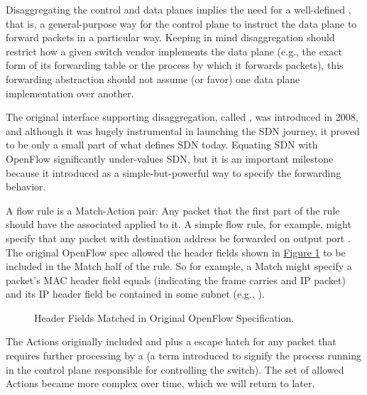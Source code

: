 \documentclass[letterpaper,11pt,english]{sphinxmanual}
\let\sphinxpxdimen\pdfpxdimen\else\newdimen\sphinxpxdimen
\begin{document}
Disaggregating the control and data planes implies the need for a
well-defined , that is, a general-purpose way
for the control plane to instruct the data plane to forward packets in
a particular way. Keeping in mind disaggregation should 
restrict how a given switch vendor implements the data plane (e.g.,
the exact form of its forwarding table or the process by which it
forwards packets), this forwarding abstraction should not assume (or
favor) one data plane implementation over another.

The original interface supporting disaggregation, called ,
was introduced in 2008, and although it was hugely instrumental in
launching the SDN journey, it proved to be only a small part of what
defines SDN today. Equating SDN with OpenFlow significantly
under-values SDN, but it is an important milestone because it
introduced  as a simple-but-powerful way to specify the
forwarding behavior.

A flow rule is a Match-Action pair: Any packet that  the
first part of the rule should have the associated  applied to
it. A simple flow rule, for example, might specify that any packet
with destination address  be forwarded on output port . The
original OpenFlow spec allowed the header fields shown in
\hyperref[\detokenize{intro:fig-headers}]{Figure \ref{\detokenize{intro:fig-headers}}} to be included in the Match half of
the rule. So for example, a Match might specify a packet’s MAC header
 field equals  (indicating the frame carries and IP
packet) and its IP header  field be contained in some
subnet (e.g., ).

\begin{figure}[htbp]
\centering
\capstart

\noindent\sphinxincludegraphics[width=600\sphinxpxdimen]{{Slide3}.png}
\caption{Header Fields Matched in Original OpenFlow Specification.}\label{\detokenize{intro:id12}}\label{\detokenize{intro:fig-headers}}\end{figure}

The Actions originally included  and  plus a  escape hatch for any packet that requires further processing
by a  (a term introduced to signify the process running in
the control plane responsible for controlling the switch). The set of
allowed Actions became more complex over time, which we will return to
later.
\end{document}

